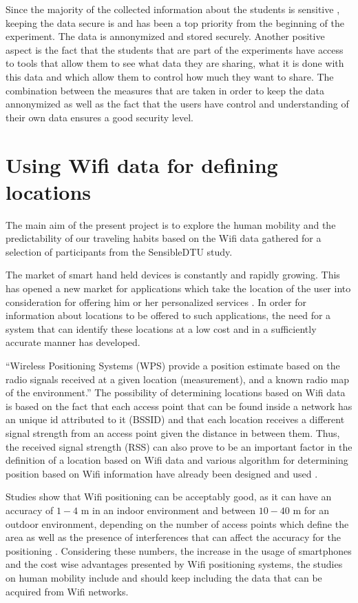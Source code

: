 Since the majority of the collected information about the students is sensitive
\cite{Stopczynski14p}, keeping the data secure is and has been a top priority
from the beginning of the experiment. The data is annonymized and stored
securely. Another positive aspect is the fact that the students that are part of
the experiments have access to tools that allow them to see what data they are
sharing, what it is done with this data and which allow them to control how much
they want to share. The combination between the measures that are taken in order
to keep the data annonymized as well as the fact that the users have control and
understanding of their own data ensures a good security level.


\section{Using Wifi data for defining locations}

The main aim of the present project is to explore the human mobility and the
predictability of our traveling habits based on the Wifi data gathered for
a selection of participants from the SensibleDTU study.  

The market of smart hand held devices is constantly and rapidly growing. This
has opened a new market for applications which take the location of the user
into consideration for offering him or her personalized services
\cite{alsehly2010improving}. In order for information about locations to be
offered to such applications, the need for a system that can identify these
locations at a low cost and in a sufficiently accurate manner has developed.

``Wireless Positioning Systems (WPS) provide a position estimate based on the
radio signals received at a given location (measurement), and a known radio map
of the environment.''\cite{athanasiou2009utilizing} The possibility of
determining locations based on Wifi data is based on the fact that each access
point that can be found inside a network has an unique id attributed to it
(BSSID) and that each location receives a different signal strength from an
access point given the distance in between them. Thus, the received signal
strength (RSS) can also prove to be an important factor in the definition of a
location based on Wifi data and various algorithm for determining position based
on Wifi information have already been designed and used
\cite{athanasiou2009utilizing}.

Studies show that Wifi positioning can be acceptably good, as it can have an
accuracy of $1-4$ m in an indoor environment and between $10-40$ m for an
outdoor environment, depending on the number of access points which define the
area as well as the presence of interferences that can affect the accuracy for
the positioning \cite{Cheng:2005:ACM:1067170.1067195} \cite{mok2007location}.
Considering these numbers, the increase in the usage of smartphones and the cost
wise advantages presented by Wifi positioning systems, the studies on human
mobility include and should keep including the data that can be acquired from
Wifi networks.

